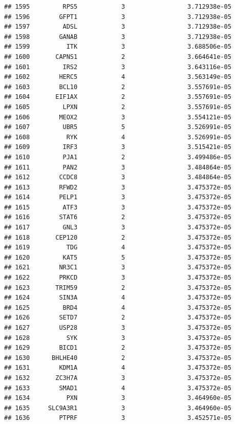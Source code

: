 \documentclass[
]{article}
\begin{document}
\begin{verbatim}
## 1595         RPS5            3                 3.712938e-05
## 1596        GFPT1            3                 3.712938e-05
## 1597         ADSL            3                 3.712938e-05
## 1598        GANAB            3                 3.712938e-05
## 1599          ITK            3                 3.688506e-05
## 1600       CAPNS1            2                 3.664641e-05
## 1601         IRS2            3                 3.643116e-05
## 1602        HERC5            4                 3.563149e-05
## 1603        BCL10            2                 3.557691e-05
## 1604       EIF1AX            2                 3.557691e-05
## 1605         LPXN            2                 3.557691e-05
## 1606        MEOX2            3                 3.554121e-05
## 1607         UBR5            5                 3.526991e-05
## 1608          RYK            4                 3.526991e-05
## 1609         IRF3            3                 3.515421e-05
## 1610         PJA1            2                 3.499486e-05
## 1611         PAN2            3                 3.484864e-05
## 1612        CCDC8            3                 3.484864e-05
## 1613        RFWD2            3                 3.475372e-05
## 1614        PELP1            3                 3.475372e-05
## 1615         ATF3            3                 3.475372e-05
## 1616        STAT6            2                 3.475372e-05
## 1617         GNL3            3                 3.475372e-05
## 1618       CEP120            2                 3.475372e-05
## 1619          TDG            4                 3.475372e-05
## 1620         KAT5            5                 3.475372e-05
## 1621        NR3C1            3                 3.475372e-05
## 1622        PRKCD            3                 3.475372e-05
## 1623       TRIM59            2                 3.475372e-05
## 1624        SIN3A            4                 3.475372e-05
## 1625         BRD4            4                 3.475372e-05
## 1626        SETD7            2                 3.475372e-05
## 1627        USP28            3                 3.475372e-05
## 1628          SYK            3                 3.475372e-05
## 1629        BICD1            2                 3.475372e-05
## 1630      BHLHE40            2                 3.475372e-05
## 1631        KDM1A            4                 3.475372e-05
## 1632       ZC3H7A            3                 3.475372e-05
## 1633        SMAD1            4                 3.475372e-05
## 1634          PXN            3                 3.464960e-05
## 1635     SLC9A3R1            3                 3.464960e-05
## 1636        PTPRF            3                 3.452571e-05

\end{verbatim}
\end{document}
